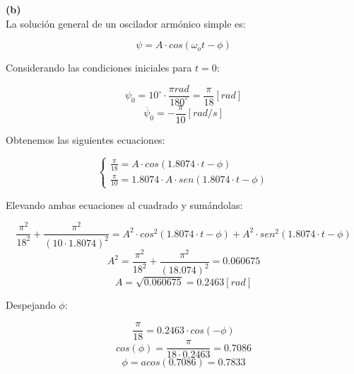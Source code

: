 \documentclass[letter,11pt]{article}
\begin{document}
\textbf{(b)} \\

La solución general de un oscilador armónico simple es:

\begin{equation*}
    \psi = A \cdot cos(\omega_o t - \phi)
\end{equation*}

Considerando las condiciones iniciales para $t = 0$:

\begin{equation*}
    \psi_0 = 10^\circ \cdot \frac{\pi rad}{180^\circ} = \frac{\pi}{18} [rad]
\end{equation*}
\begin{equation*}
    \dot{\psi_0} = - \frac{\pi}{10} [rad/s]
\end{equation*}

Obtenemos las siguientes ecuaciones:

\begin{equation}
    \begin{cases}
        \frac{\pi}{18} = A \cdot cos(1.8074 \cdot t - \phi) \\
        \frac{\pi}{10} = 1.8074 \cdot A \cdot sen(1.8074 \cdot t - \phi)
    \end{cases}
\end{equation}

Elevando ambas ecuaciones al cuadrado y sumándolas:

\begin{equation*}
    \frac{\pi^2}{18^2} + \frac{\pi^2}{(10 \cdot 1.8074)^2} = A^2 \cdot cos^2(1.8074 \cdot t - \phi) + A^2 \cdot sen^2(1.8074 \cdot t - \phi)
\end{equation*}
\begin{equation*}
    A^2 = \frac{\pi^2}{18^2} + \frac{\pi^2}{(18.074)^2} = 0.060675
\end{equation*}
\begin{equation*}
    A = \sqrt{0.060675} = 0.2463 [rad]
\end{equation*}

Despejando $\phi$:

\begin{equation*}
    \frac{\pi}{18} = 0.2463 \cdot cos(-\phi)
\end{equation*}
\begin{equation*}
    cos(\phi) = \frac{\pi}{18 \cdot 0.2463} = 0.7086
\end{equation*}
\begin{equation*}
    \phi = acos(0.7086) = 0.7833
\end{equation*}
\end{document}
